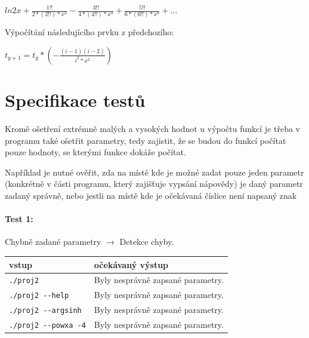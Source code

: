 \documentclass[12pt,a4paper,titlepage,final]{article}
\begin{document}
\begin{center}
$ {\displaystyle ln2x + \frac{1!!}{2*(2!!)*x^{2}} - \frac{3!!}{4*(4!!)*x^{4}}+
\frac{5!!}{6*(6!!)*x^{6}} + \ldots}$\end{center}

Výpočítání následujícího prvku z předchozího:

\begin{center}
$ {\displaystyle t_{y+1} = t_{y} * (- \frac{(i-1)(i-2)}{i^{2}*x^{2}})}$
\end{center}



\section{Specifikace testů} \label{specif}


Kromě ošetření extrémně malých a vysokých hodnot u výpočtu funkcí je třeba
v programu také ošetřit parametry, tedy zajistit, že se budou do funkcí
počítat pouze hodnoty, se kterými funkce dokáže počítat.

Například je nutné ověřit, zda na místě kde je možné zadat pouze jeden
parametr (konkrétně v části programu, který zajišťuje vypsání nápovědy) je
daný parametr zadaný správně, nebo jestli na místě kde je očekávaná číslice
není napsaný znak

\paragraph{Test 1:} Chybně zadané parametry $\longrightarrow$ Detekce chyby.

\vspace{1em}\begin{tabular}{ll} %
vstup & očekávaný výstup \\
\hline
\verb|./proj2| & Byly nesprávně zapsané parametry. \\
\verb|./proj2 --help| & Byly nesprávně zapsané parametry. \\
\verb|./proj2 --argsinh| & Byly nesprávně zapsané parametry. \\
\verb|./proj2 --powxa -4| & Byly nesprávně zapsané parametry. \\
\end{tabular} 
\end{document}
